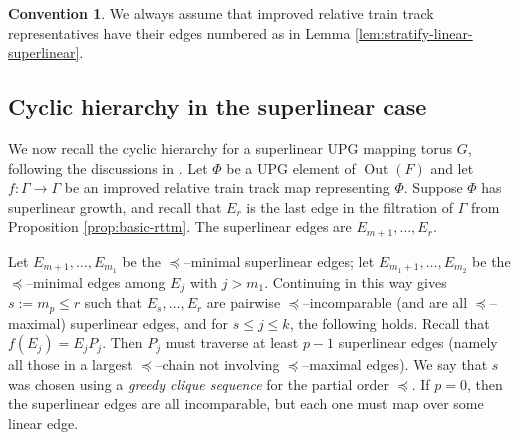 \documentclass[11pt,oneside]{amsart}
\newcounter{ax}
\theoremstyle{definition}
\newtheorem{conv}[thm]{Convention}
\DeclareMathOperator{\Out}{Out}
\begin{document}
\begin{conv}\label{conv:edge-labels}
We always assume that 
improved relative train track representatives have their edges numbered as in Lemma \ref{lem:stratify-linear-superlinear}.
\end{conv}


\subsection{Cyclic hierarchy in the superlinear case}\label{subsec:topmost-edge-splittings}
We now recall the cyclic hierarchy for a superlinear UPG mapping torus $G$, following the discussions in \cite{Macura:detour,Hagen:thickness,AndrewHughesKudlinska}. Let $\Phi$ be a UPG element of $\Out(F)$ and let 
$f:\Gamma\to\Gamma$ be an improved relative train track map representing $\Phi$.  Suppose $\Phi$ has superlinear growth, and recall that 
$E_r$ is the last edge in the filtration of $\Gamma$ from Proposition 
\ref{prop:basic-rttm}.  The superlinear edges are $E_{m+1},\ldots,E_r$.  

Let $E_{m+1},\ldots,E_{m_1}$ be the $\preceq$--minimal superlinear edges; let 
$E_{m_1+1},\ldots,E_{m_2}$ be the $\preceq$--minimal edges among $E_j$ with 
$j>m_1$.  Continuing in this way gives $s:=m_p\leq r$ such that 
$E_s,\ldots,E_r$ are pairwise $\preceq$--incomparable (and are all 
$\preceq$--maximal) superlinear edges, and for $s\leq j\leq k$, the following 
holds.  Recall that $f(E_j)=E_jP_j$.  Then $P_j$ must traverse at least $p-1$ 
superlinear edges (namely all those in a largest $\preceq$--chain not involving $\preceq$--maximal edges).  We say 
that $s$ was chosen using a \emph{greedy clique sequence} for the partial order 
$\preceq$.  If $p=0$, then the superlinear edges are all incomparable, but each one must map over some linear edge.
\end{document}
